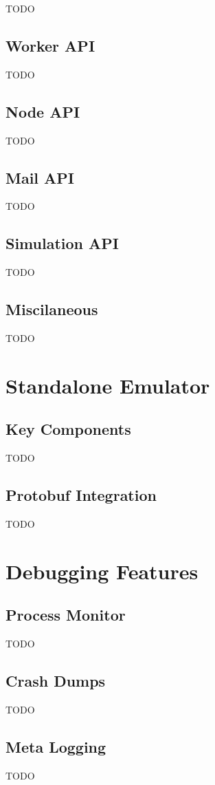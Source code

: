 TODO

\subsection{Worker API}

TODO

\subsection{Node API}

TODO

\subsection{Mail API}

TODO

\subsection{Simulation API}

TODO

\subsection{Miscilaneous}

TODO


\section{Standalone Emulator}

\subsection{Key Components}

TODO

\subsection{Protobuf Integration}

TODO


\section{Debugging Features}

\subsection{Process Monitor}

TODO

\subsection{Crash Dumps}

TODO

\subsection{Meta Logging}

TODO
